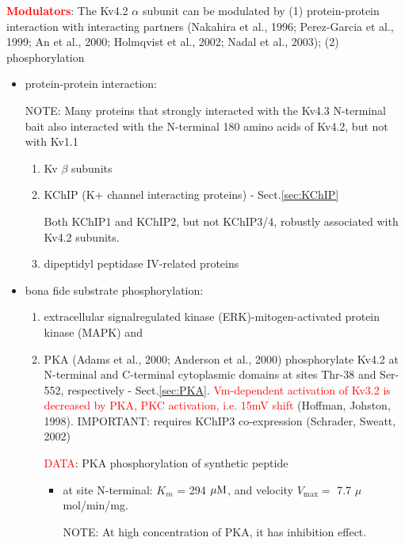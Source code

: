 \textcolor{red}{\bf Modulators}: The Kv4.2 $\alpha$
subunit can be modulated by (1) protein-protein interaction with interacting
partners (Nakahira et al., 1996; Perez-Garcia et al., 1999; An et al., 2000;
Holmqvist et al., 2002; Nadal et al., 2003); (2) phosphorylation

\begin{itemize}
  \item protein-protein interaction:

NOTE: Many proteins that strongly interacted with the Kv4.3 N-terminal bait also
interacted with the N-terminal 180 amino acids of Kv4.2, but not with Kv1.1
  
\begin{enumerate}
  \item Kv $\beta$ subunits


  \item KChIP (K+ channel interacting proteins) - Sect.\ref{sec:KChIP}

Both KChIP1 and KChIP2, but not KChIP3/4, robustly associated with Kv4.2
subunits.
  
  \item dipeptidyl peptidase IV-related proteins 
\end{enumerate}

  \item bona fide substrate phosphorylation:
 
\begin{enumerate}
  \item extracellular signalregulated kinase (ERK)-mitogen-activated protein
  kinase (MAPK) and 
  
  \item PKA (Adams et al., 2000; Anderson et al., 2000) phosphorylate Kv4.2 at
  N-terminal and C-terminal cytoplasmic domains at sites Thr-38 and Ser-552,
  respectively - Sect.\ref{sec:PKA}. \textcolor{red}{Vm-dependent activation of
  Kv3.2 is decreased by PKA, PKC activation, i.e. 15mV shift } (Hoffman,
  Johston, 1998). IMPORTANT: requires KChIP3 co-expression (Schrader, Sweatt,
  2002)

\textcolor{red}{DATA}: PKA phosphorylation of synthetic peptide
\begin{itemize}
  \item at site N-terminal: $K_m$ = 294 ${\mu\text{M}}$, and velocity $V_\max = $ 7.7
  $\mu$mol/min/mg.

NOTE: At high concentration of PKA, it has inhibition effect.
  

\end{itemize}
\end{enumerate}
\end{itemize}
